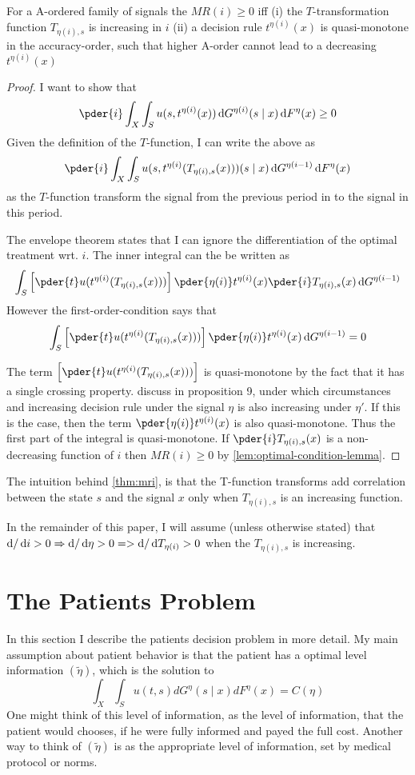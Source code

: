 \begin{theorem}\label{thm:mri}
For a A-ordered family of signals the $MR(i)\geq0$ iff (i) the $T$-transformation function $T_{\eta(i),s}$ is increasing in $i$ (ii) a decision rule $t^{\eta(i)}(x)$ is quasi-monotone in the accuracy-order, such that higher A-order cannot lead to a decreasing $t^{\eta(i)}(x)$
\end{theorem}
\begin{proof}
I want to show that
\[
	\pder{i}\int_X\int_S u(s,t^{\eta(i)}(x))\dif G^{\eta(i)}(s\mid x)\dif F^\eta(x)\geq0
\]
Given the definition of the $T$-function, I can write the above as
\[
	\pder{i}\int_X\int_S u(s,t^{\eta(i)}(T_{\eta(i),s}(x)))(s\mid x)\dif G^{\eta(i-1)}\dif F^\eta(x)
\]
as the $T$-function transform the signal from the previous period in to the signal in this period.

The envelope theorem states that I can ignore the differentiation of the optimal treatment wrt. $i$. The inner integral can the be written as
\[
	\int_S \left[\pder{t}u(t^{\eta(i)}(T_{\eta(i),s}(x)))\right]\pder{\eta(i)}t^{\eta(i)}(x)\pder{i}T_{\eta(i),s}(x)\dif G^{\eta(i-1)}
\]
However the first-order-condition says that
\[
	\int_S \left[\pder{t}u(t^{\eta(i)}(T_{\eta(i),s}(x)))\right]\pder{\eta(i)}t^{\eta(i)}(x)\dif G^{\eta(i-1)}=0
\]

The term $\left[\pder{t}u(t^{\eta(i)}(T_{\eta(i),s}(x)))\right]$ is quasi-monotone by the fact that it has a single crossing property. \textcite{Quah2009Comparative} discuss in proposition 9, under which circumstances and increasing decision rule under the signal $\eta$ is also increasing under $\eta'$. If this is the case, then the term $\pder{\eta(i)}t^{\eta(i)}(x)$ is also quasi-monotone. Thus the first part of the integral is quasi-monotone. If $\pder{i}T_{\eta(i),s}(x)$ is a non-decreasing function of $i$ then $MR(i)\geq0$ by \cref{lem:optimal-condition-lemma}.
\end{proof}
The intuition behind \cref{thm:mri}, is that the T-function transforms add correlation between the state $s$ and the signal $x$ only when $T_{\eta(i),s}$ is an increasing function. 

In the remainder of this paper, I will assume (unless otherwise stated) that $\dif /\dif i >0 \Rightarrow \dif/\dif \eta >0 => \dif / \dif T_{\eta(i)}>0$ when the $T_{\eta(i),s}$ is increasing. 

\section{The Patients Problem} %
\label{sec:the_patients_problem}
In this section I describe the patients decision problem in more detail. My main assumption about patient behavior is that the patient has a optimal level information $(\tilde{\eta})$, which is the solution to
\[
    \int_X\int_S u(t,s)dG^{\eta}(s\mid x)dF^\eta(x)=C(\eta)
\]
One might think of this level of information, as the level of information, that the patient would chooses, if he were fully informed and payed the full cost. Another way to think of $(\tilde{\eta})$ is as the appropriate level of information, set by medical protocol or norms.



